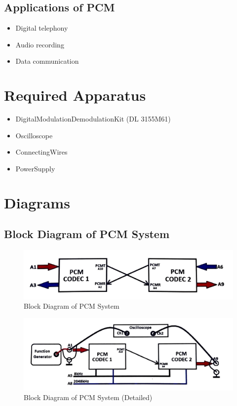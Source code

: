 \documentclass[12pt]{article}
\begin{document}
\subsection*{Applications of PCM}
\begin{itemize}
    \item Digital telephony
    \item Audio recording
    \item Data communication
\end{itemize}

\section*{Required Apparatus}
\begin{itemize}
    \item DigitalModulationDemodulationKit (DL 3155M61)
    \item Oscilloscope
    \item ConnectingWires
    \item PowerSupply
\end{itemize}

\section*{Diagrams}
\subsection*{Block Diagram of PCM System}
\begin{figure}[H]
    \centering
    \includegraphics[width=\textwidth]{ckt.png}
    \caption{Block Diagram of PCM System}
    \label{fig:ckt}
\end{figure}

\begin{figure}[H]
    \centering
    \includegraphics[width=\textwidth]{cktD.png}
    \caption{Block Diagram of PCM System (Detailed)}
    \label{fig:cktD}
\end{figure}
\end{document}
